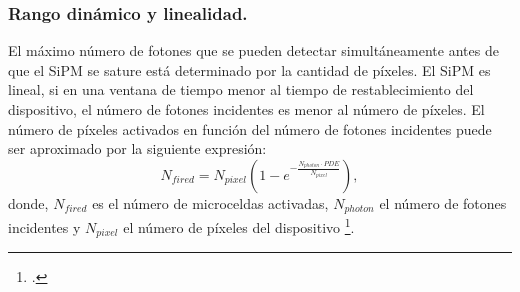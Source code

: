 \subsubsection{Rango dinámico y linealidad.}
El máximo número de fotones que se pueden detectar simultáneamente antes de que el SiPM se sature está determinado por la cantidad de píxeles. El SiPM es lineal, si en una ventana de tiempo menor al tiempo de restablecimiento del dispositivo, el número de fotones incidentes es menor al número de píxeles. El número de píxeles activados en función del número de fotones incidentes puede ser aproximado por la siguiente expresión:
\begin{equation}
    N_{fired}=N_{pixel}\left (1-e^{-\frac{N_{photon}\cdot PDE}{N_{pixel}}}\right),
    \label{rangoDinamico}
\end{equation}
donde, $N_{fired}$ es el número de microceldas activadas, $N_{photon}$ el número de fotones incidentes y $N_{pixel}$ el número de píxeles del dispositivo \footcite{Apd_Hamamatsu}.
